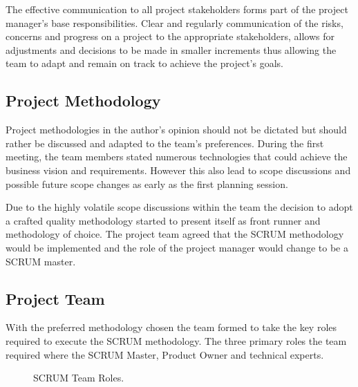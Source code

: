 \documentclass[12pt]{witseiepaper}
\begin{document}
The effective communication to all project stakeholders forms part of the project manager’s base responsibilities. Clear and regularly communication of the risks, concerns and progress on a project to the appropriate stakeholders, allows for adjustments and decisions to be made in smaller increments thus allowing the team to adapt and remain on track to achieve the project’s goals.

\subsection{Project Methodology}
Project methodologies in the author's opinion should not be dictated but should rather be discussed and adapted to the team's preferences. During the first meeting, the team members stated numerous technologies that could achieve the business vision and requirements. However this also lead to scope discussions and possible future scope changes as early as the first planning session.

Due to the highly volatile scope discussions within the team the decision to adopt a crafted quality methodology \cite{craft} started to present itself as front runner and methodology of choice. The project team agreed that the SCRUM methodology \cite{ExpertJudgement} would be implemented and the role of the project manager would change to be a SCRUM master. \cite{SCUMMaster}

\subsection{Project Team}

With the preferred methodology chosen the team formed to take the key roles required to execute the SCRUM methodology. The three primary roles the team required where the SCRUM Master, Product Owner and technical experts.\\

\begin{figure}[H]
	\caption{SCRUM Team Roles.} 
	\label{fig:SCRUMTeam}
\end{figure}
\end{document}
